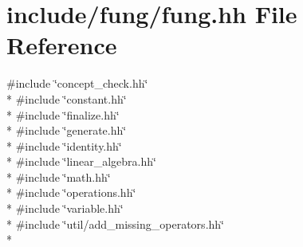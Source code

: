 \hypertarget{fung_8hh}{\section{include/fung/fung.hh File Reference}
\label{fung_8hh}
}
{\ttfamily \#include \char`\"{}concept\-\_\-check.\-hh\char`\"{}}\\*
{\ttfamily \#include \char`\"{}constant.\-hh\char`\"{}}\\*
{\ttfamily \#include \char`\"{}finalize.\-hh\char`\"{}}\\*
{\ttfamily \#include \char`\"{}generate.\-hh\char`\"{}}\\*
{\ttfamily \#include \char`\"{}identity.\-hh\char`\"{}}\\*
{\ttfamily \#include \char`\"{}linear\-\_\-algebra.\-hh\char`\"{}}\\*
{\ttfamily \#include \char`\"{}math.\-hh\char`\"{}}\\*
{\ttfamily \#include \char`\"{}operations.\-hh\char`\"{}}\\*
{\ttfamily \#include \char`\"{}variable.\-hh\char`\"{}}\\*
{\ttfamily \#include \char`\"{}util/add\-\_\-missing\-\_\-operators.\-hh\char`\"{}}\\*
